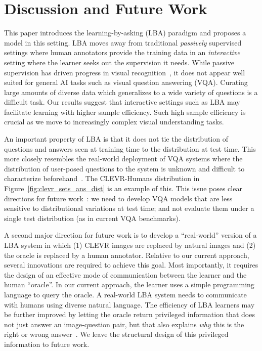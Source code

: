 \documentclass[10pt,twocolumn,letterpaper]{article}
\begin{document}
\section{Discussion and Future Work}
\vspace{-0.05in}
This paper introduces the learning-by-asking (LBA) paradigm and proposes a model in this setting. LBA moves away from traditional \emph{passively} supervised settings where human annotators provide the training data in an \emph{interactive} setting where the learner seeks out the supervision it needs. While passive supervision has driven progress in visual recognition~\cite{he2016deep,he2017maskrcnn}, it does not appear well suited for general AI tasks such as visual question answering (VQA). Curating large amounts of diverse data which generalizes to a wide variety of questions is a difficult task. Our results suggest that interactive settings such as LBA may facilitate learning with higher sample efficiency. Such high sample efficiency is crucial as we move to increasingly complex visual understanding tasks.

An important property of LBA is that it does not tie the distribution of questions and answers seen at training time to the distribution at test time. This more closely resembles the real-world deployment of VQA systems where the distribution of user-posed questions to the system is unknown and difficult to characterize beforehand~\cite{bottou2013counterfactual}. The CLEVR-Humans distribution in Figure~\ref{fig:clevr_sets_ans_dist} is an example of this. This issue poses clear directions for future work~\cite{bottou2015icml}: we need to develop VQA models that are less sensitive to distributional variations at test time; and not evaluate them under a single test distribution (as in current VQA benchmarks). 

A second major direction for future work is to develop a ``real-world'' version of a LBA system in which (1) CLEVR images are replaced by natural images and (2) the oracle is replaced by a human annotator. Relative to our current approach, several innovations are required to achieve this goal. Most importantly, it requires the design of an effective mode of communication between the learner and the human ``oracle''. In our current approach, the learner uses a simple programming language to query the oracle. A real-world LBA system needs to communicate with humans using diverse natural language. The efficiency of LBA learners may be further improved by letting the oracle return privileged information that does not just answer an image-question pair, but that also explains \emph{why} this is the right or wrong answer~\cite{vapnik2015learning}. We leave the structural design of this privileged information to future work. 
\end{document}
